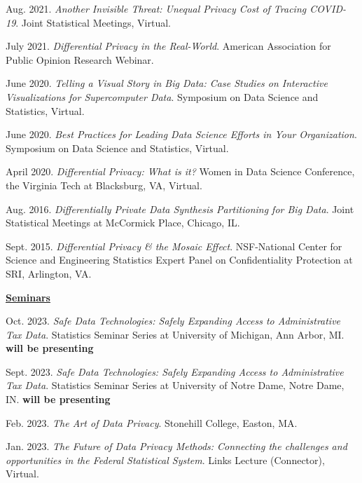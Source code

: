 \begin{etaremune}[topsep=0pt, itemsep=5pt, partopsep=0pt, parsep=0pt]
    \item Aug. 2021. \textit{Another Invisible Threat: Unequal Privacy Cost of Tracing COVID-19}. Joint Statistical Meetings, Virtual.
    
    \item July 2021. \textit{Differential Privacy in the Real-World}. American Association for Public Opinion Research Webinar.

    \item June 2020. \textit{Telling a Visual Story in Big Data: Case Studies on Interactive Visualizations for Supercomputer Data}. Symposium on Data Science and Statistics, Virtual.
  
    \item June 2020. \textit{Best Practices for Leading Data Science Efforts in Your Organization}. Symposium on Data Science and Statistics, Virtual.
  
    \item April 2020. \textit{Differential Privacy: What is it?} Women in Data Science Conference, the Virginia Tech at Blacksburg, VA, Virtual.

    \item Aug. 2016. \textit{Differentially Private Data Synthesis Partitioning for Big Data}. Joint Statistical Meetings at McCormick Place, Chicago, IL.
    
    \item Sept. 2015. \textit{Differential Privacy \& the Mosaic Effect}. NSF-National Center for Science and Engineering Statistics Expert Panel on Confidentiality Protection at SRI, Arlington, VA.

\vspace{6pt}
\hspace{-0.30in}\underline{\textbf{\large Seminars}}\normalsize
    \item Oct. 2023. \textit{Safe Data Technologies: Safely Expanding Access to Administrative Tax Data}. Statistics Seminar Series at University of Michigan, Ann Arbor, MI. \textbf{will be presenting}
    
    \item Sept. 2023. \textit{Safe Data Technologies: Safely Expanding Access to Administrative Tax Data}. Statistics Seminar Series at University of Notre Dame, Notre Dame, IN. \textbf{will be presenting}
    
    \item Feb. 2023. \textit{The Art of Data Privacy}. Stonehill College, Easton, MA.
    
    \item Jan. 2023. \textit{The Future of Data Privacy Methods: Connecting the challenges and opportunities in the Federal Statistical System}. Links Lecture (Connector), Virtual.
    

\end{etaremune}
